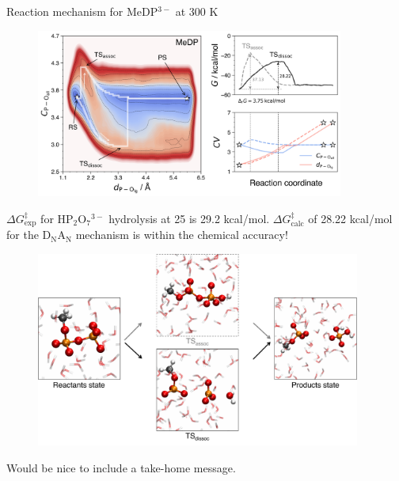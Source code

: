 \documentclass[11pt,t]{beamer}
\begin{document}
\begin{frame}{Reaction mechanism for MeDP$^{3-}$ at 300 K}
	\vspace{-10pt}
	\begin{figure}
		\centering
		\includegraphics[width=0.9\textwidth]{Figures/results_MeDP_300K_fes_mfep.png}
	\end{figure}
	\small
	$\Delta G^\ddagger_\text{exp}$ for HP$_2$O$_7$$^{3-}$ hydrolysis at 25 is 29.2 kcal/mol. $\Delta G^\ddagger_\text{calc}$ of 28.22 kcal/mol for the D$_\text{N}$A$_\text{N}$ mechanism is within the chemical accuracy!
\end{frame}



\begin{frame}
	\vspace{-10pt}
	\begin{figure}
		\centering
		\includegraphics[width=0.95\textwidth]{Figures/results_MeDP_reaction_mechanism_steps.pdf}
	\end{figure}
	\small
	Would be nice to include a take-home message.
\end{frame}
\end{document}
